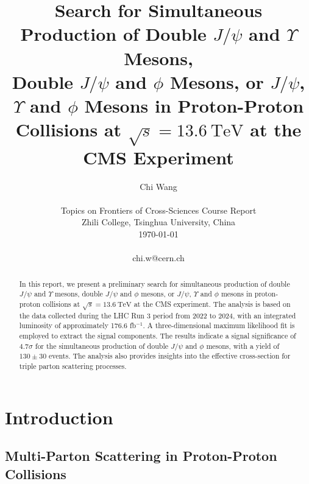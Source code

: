 \documentclass[10pt,twocolumn]{article}
\begin{document}
\title{Search for Simultaneous Production of Double $J/\psi$ and $\Upsilon$ Mesons,\\Double $J/\psi$ and $\phi$ Mesons, or $J/\psi$, $\Upsilon$ and $\phi$ Mesons in Proton-Proton\\ Collisions at $\sqrt{s} = 13.6 ~ \mathrm{TeV}$ at the CMS Experiment}

\author{Chi Wang \\
\\
Topics on Frontiers of Cross-Sciences Course Report \\
Zhili College, Tsinghua University, China \\
\today
\\
\\
chi.w@cern.ch  \\
}

\maketitle
\thispagestyle{empty}

\begin{abstract}
In this report, we present a preliminary search for simultaneous production of double $J/\psi$ and $\Upsilon$ mesons, double $J/\psi$ and $\phi$ mesons, or $J/\psi$, $\Upsilon$ and $\phi$ mesons in proton-proton collisions at $\sqrt{s} = 13.6 ~ \mathrm{TeV}$ at the CMS experiment. The analysis is based on the data collected during the LHC Run 3 period from 2022 to 2024, with an integrated luminosity of approximately 176.6 fb$^{-1}$. A three-dimensional maximum likelihood fit is employed to extract the signal components. The results indicate a signal significance of $4.7 \sigma$ for the simultaneous production of double $J/\psi$ and $\phi$ mesons, with a yield of $130 \pm 30$ events. The analysis also provides insights into the effective cross-section for triple parton scattering processes.
\end{abstract}


\section{Introduction}

\subsection{Multi-Parton Scattering in Proton-Proton Collisions}
\end{document}
